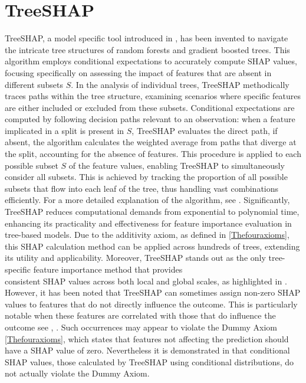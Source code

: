 \documentclass[12pt]{article}
\begin{document}
\section{TreeSHAP}
TreeSHAP, a model specific tool introduced in \cite{lundberg2019explainable}, has been invented to navigate the intricate tree structures of random forests and gradient boosted trees. This algorithm employs conditional expectations to accurately compute SHAP values, focusing specifically on assessing the impact of features that are absent in different subsets $S$.
In the analysis of individual trees, TreeSHAP methodically traces paths within the tree structure, examining scenarios where specific features are either included or excluded from these subsets. 
Conditional expectations are computed by following decision paths relevant to an observation: when a feature implicated in a split is present in $S$, TreeSHAP evaluates the direct path, if absent, the algorithm calculates the weighted average from paths that diverge at the split, accounting for the absence of features.
This procedure is applied to each possible subset $S$ of the feature values, enabling TreeSHAP to simultaneously consider all subsets. This is achieved by tracking the proportion of all possible subsets that flow into each leaf of the tree, thus handling vast combinations efficiently. For a more detailed explanation of the algorithm, see \cite[p.~23]{lundberg2019explainable}.
Significantly, TreeSHAP reduces computational demands from exponential to polynomial time, enhancing its practicality and effectiveness for feature importance evaluation in tree-based models. Due to the additivity axiom, as defined in \ref{Thefouraxioms}, this SHAP calculation method can be applied across hundreds of trees, extending its utility and applicability.
Moreover, TreeSHAP stands out as the only tree-specific feature importance method that provides\\ consistent SHAP values across both local and global scales, as highlighted in \cite{lundberg2019consistent}.
However, it has been noted that TreeSHAP can sometimes assign non-zero SHAP values to features that do not directly influence the outcome. This is particularly notable when these features are correlated with those that do influence the outcome see \cite{sundararajan2020shapley}, \cite{pmlr-v108-janzing20a}. Such occurrences may appear to violate the Dummy Axiom \ref{Thefouraxioms}, which states that features not affecting the prediction should have a SHAP value of zero.
Nevertheless it is demonstrated in \cite[p.~108]{molnarSHAP} that conditional SHAP values, those calculated by TreeSHAP using conditional distributions, do not actually violate the Dummy Axiom.
\end{document}
